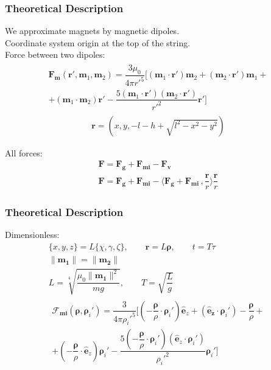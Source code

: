\documentclass{beamer}
\begin{document}
\begin{frame}

\frametitle{Theoretical Description}
We approximate magnets by magnetic dipoles.\\
Coordinate system origin at the top of the string.\\
Force between two dipoles:
\begin{gather}
%
\begin{split}
\mathbf{F_m}(\mathbf{r'}, \mathbf{m}_1, \mathbf{m}_2) = \dfrac{3 \mu_0}{4 \pi r'^5} \Big [ (\mathbf{m}_1\cdot\mathbf{r'})\mathbf{m}_2 + (\mathbf{m}_2\cdot\mathbf{r'})\mathbf{m}_1 + \\
+ (\mathbf{m}_1\cdot\mathbf{m}_2)\mathbf{r'} - \dfrac{5(\mathbf{m}_1\cdot\mathbf{r'})(\mathbf{m}_2\cdot\mathbf{r'})}{r'^2}\mathbf{r'} \Big ]
\end{split}
\end{gather}
\begin{gather}
\textbf{r} = \left( x, y, - l - h + \sqrt{l^2 - x^2 - y^2} \right)
\end{gather}

All forces:
\begin{gather}
\mathbf{F} = \mathbf{F_g} + \mathbf{F_{mi}} - \mathbf{F_v}
\\
\mathbf{F} = \mathbf{F_g} + \mathbf{F_{mi}} - \langle \mathbf{F_g} + \mathbf{F_{mi}} \, , \dfrac{\mathbf{r}}{r} \rangle \dfrac{\mathbf{r}}{r}
\end{gather}

\end{frame}


\begin{frame}

\frametitle{Theoretical Description}

Dimensionless:
\begin{gather}
\{x, y, z\} = L \{\chi, \gamma, \zeta\}, \qquad \bm r = L \bm \rho, \qquad t = T \tau
\\
\lVert \mathbf{m_1} \rVert = \lVert \mathbf{m_2} \rVert
\\
L = \sqrt[4]{\dfrac{\mu_0 \lVert \mathbf{m_1} \rVert^2}{mg}}, \qquad T = \sqrt{\dfrac{L}{g}}
\\
\begin{split}
\mathbf{\mathcal{F}_{mi}}(\bm \rho, \bm \rho_i') = \dfrac{3}{4 \pi \rho_i'^5} \Bigg [ (-\dfrac{\bm \rho}{\rho}   \cdot \bm \rho_i')\mathbf{\hat{e}}_z + (\mathbf{\hat{e}_z} \cdot\bm \rho_i')-\dfrac{\bm \rho}{\rho} +  \\
 + (-\dfrac{\bm \rho}{\rho}\cdot\mathbf{\hat{e}}_z) \bm \rho_i' - \dfrac{5(-\dfrac{\bm \rho}{\rho}\cdot \bm \rho_i')(\mathbf{\hat{e}}_z\cdot \bm \rho_i')}{\rho_i'^2} \bm \rho_i' \Bigg]
\end{split}
\end{gather}

\end{frame}
\end{document}
